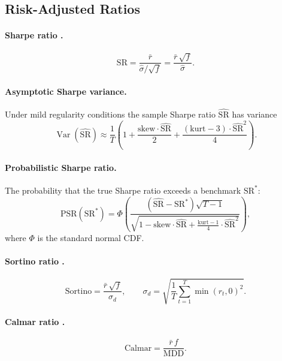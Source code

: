 \documentclass[11pt,a4paper]{article}
\newcommand{\Var}{\operatorname{Var}}
\newcommand{\sr}{\widehat{\mathrm{SR}}}
\begin{document}
\subsection{Risk-Adjusted Ratios}

\paragraph{Sharpe ratio \citep{sharpe1966}.}
\begin{equation}
  \mathrm{SR} = \frac{\bar{r}}{\hat\sigma / \sqrt{f}} = \frac{\bar{r}\,\sqrt{f}}{\hat\sigma}.
\end{equation}

\paragraph{Asymptotic Sharpe variance.}
Under mild regularity conditions \citep{bailey2012} the sample Sharpe ratio
$\sr$ has variance
\begin{equation}
  \Var(\sr) \approx \frac{1}{T}\left(1 + \frac{\mathrm{skew}\cdot\sr}{2} +
  \frac{(\mathrm{kurt}-3)\cdot\sr^2}{4}\right).
\end{equation}

\paragraph{Probabilistic Sharpe ratio.}
The probability that the true Sharpe ratio exceeds a benchmark $\mathrm{SR}^*$:
\begin{equation}
  \mathrm{PSR}(\mathrm{SR}^*) = \Phi\!\left(
    \frac{(\sr - \mathrm{SR}^*)\sqrt{T-1}}{\sqrt{1 - \mathrm{skew}\cdot\sr +
    \frac{\mathrm{kurt}-1}{4}\cdot\sr^2}}
  \right),
\end{equation}
where $\Phi$ is the standard normal CDF.

\paragraph{Sortino ratio \citep{sortino1994}.}
\begin{equation}
  \mathrm{Sortino} = \frac{\bar{r}\,\sqrt{f}}{\sigma_d}, \qquad
  \sigma_d = \sqrt{\frac{1}{T}\sum_{t=1}^{T}\min(r_t, 0)^2}.
\end{equation}

\paragraph{Calmar ratio \citep{calmar1991}.}
\begin{equation}
  \mathrm{Calmar} = \frac{\bar{r}\,f}{\mathrm{MDD}}.
\end{equation}
\end{document}
